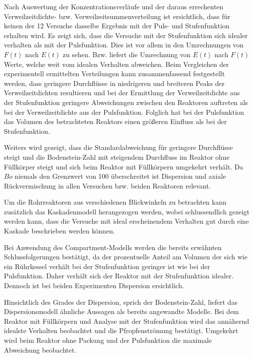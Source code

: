 \documentclass[12pt,liststotoc]{report}
\begin{document}
\par Nach Auswertung der Konzentrationsverläufe und der daraus errechenten Verweilzeitdichte- bzw. Verweilzeitsummenverteilung ist ersichtlich, dass für keinen der 12 Versuche dasselbe Ergebnis mit der Puls- und Stufenfunktion erhalten wird. Es zeigt sich, dass die Versuche mit der Stufenfunktion sich idealer verhalten als mit der Pulsfunktion. Dies ist vor allem in den Umrechnungen von $F(t)$ nach $E(t)$ zu sehen. Bzw. liefert die Umrechnung von $E(t)$ nach $F(t)$ Werte, welche weit vom idealen Verhalten abweichen. Beim Vergleichen der experimentell ermittelten Verteilungen kann zusammenfassend festgestellt werden, dass geringere Durchflüsse in niedrigeren und breiteren Peaks der Verweilzeitdichten resultieren und bei der Ermittlung der Verweilzeitdichte aus der Stufenfunktion geringere Abweichungen zwischen den Reaktoren auftreten als bei der Verweilzeitdichte aus der Pulsfunktion. Folglich hat bei der Pulsfunktion das Volumen des betrachteten Reaktors einen größeren Einfluss als bei der Stufenfunktion. 
\par Weiters wird gezeigt, dass die Standardabweichung für geringere Durchflüsse steigt und die Bodenstein-Zahl mit steigendem Durchfluss im Reaktor ohne Füllkörper steigt und sich beim Reaktor mit Füllkörpern umgekehrt verhält. Da $Bo$ niemals den Grenzwert von 100 überschreitet ist Dispersion und axiale Rückvermischung in allen Versuchen bzw. beiden Reaktoren relevant.
\par Um die Rohrreaktoren aus verschiedenen Blickwinkeln zu betrachten kann zusätzlich das Kaskadenmodell herangezogen werden, wobei schlussendlich gezeigt werden kann, dass die Versuche mit ideal erscheinendem Verhalten gut durch eine Kaskade beschrieben werden können.
\par Bei Anwendung des Compartment-Modells werden die bereits erwähnten Schlussfolgerungen bestätigt, da der prozentuelle Anteil am Volumen der sich wie ein Rührkessel verhält bei der Stufenfunktion geringer ist wie bei der Pulsfunktion. Daher verhält sich der Reaktor mit der Stufenfunktion idealer. Dennoch ist bei beiden Experimenten Dispersion ersichtlich.
\par Hinsichtlich des Grades der Dispersion, sprich der Bodenstein-Zahl, liefert das Dispersionsmodell ähnliche Aussagen als bereits angewandte Modelle. Bei dem Reaktor mit Füllkörpern und Analyse mit der Stufenfunktion wird das annähernd idealste Verhalten beobachtet und die Pfropfenströmung bestätigt. Umgekehrt wird beim Reaktor ohne Packung und der Pulsfunktion die maximale Abweichung beobachtet.
\end{document}
